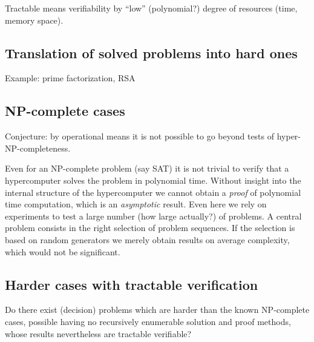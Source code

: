 Tractable means verifiability by ``low'' (polynomial?)
degree of resources (time, memory space).

\subsection{Translation of solved problems into hard ones}

Example: prime factorization, RSA


\subsection{NP-complete cases}

Conjecture: by operational means it is not possible to go beyond
tests of hyper-NP-completeness.

\begin{Alex}
Even for an NP-complete problem (say SAT) it is not trivial to
verify that a hypercomputer solves the problem in polynomial time.
Without insight into the internal structure of the hypercomputer
we cannot obtain a {\em proof} of polynomial time computation,
which is an {\em asymptotic} result. Even here we rely on
experiments to test a large number (how large actually?) of
problems. A central problem consists in the right selection of
problem sequences. If the selection is based on random generators
we merely obtain results on average complexity, which would not be
significant.
\end{Alex}

\subsection{Harder cases with tractable verification}

Do there exist (decision) problems which are harder
than the known NP-complete cases,
possible having no recursively enumerable solution and proof methods,
whose results nevertheless are tractable verifiable?

